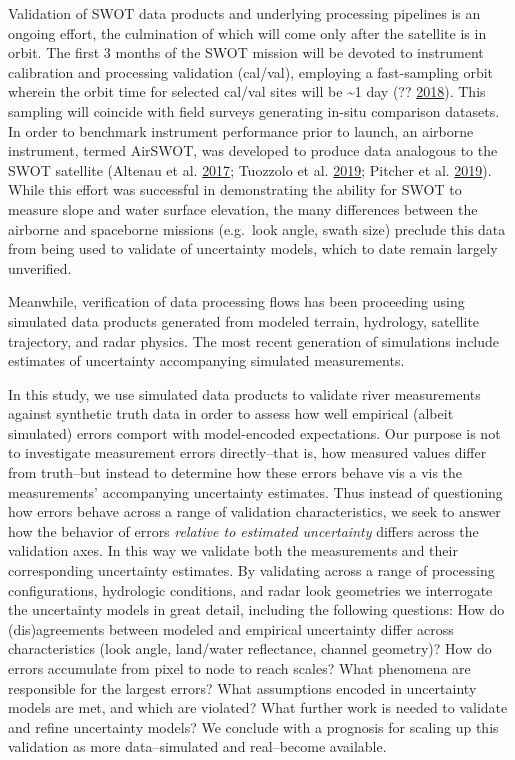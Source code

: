 \documentclass[]{book}
\begin{document}
Validation of SWOT data products and underlying processing pipelines is an ongoing effort, the culmination of which will come only after the satellite is in orbit. The first 3 months of the SWOT mission will be devoted to instrument calibration and processing validation (cal/val), employing a fast-sampling orbit wherein the orbit time for selected cal/val sites will be \textasciitilde1 day (?? \protect\hyperlink{ref-swot2018calval}{2018}). This sampling will coincide with field surveys generating in-situ comparison datasets. In order to benchmark instrument performance prior to launch, an airborne instrument, termed AirSWOT, was developed to produce data analogous to the SWOT satellite (Altenau et al. \protect\hyperlink{ref-altenau2017}{2017}; Tuozzolo et al. \protect\hyperlink{ref-tuozzolo2019}{2019}; Pitcher et al. \protect\hyperlink{ref-pitcher2019}{2019}). While this effort was successful in demonstrating the ability for SWOT to measure slope and water surface elevation, the many differences between the airborne and spaceborne missions (e.g.~look angle, swath size) preclude this data from being used to validate of uncertainty models, which to date remain largely unverified.

Meanwhile, verification of data processing flows has been proceeding using simulated data products generated from modeled terrain, hydrology, satellite trajectory, and radar physics. The most recent generation of simulations include estimates of uncertainty accompanying simulated measurements.

In this study, we use simulated data products to validate river measurements against synthetic truth data in order to assess how well empirical (albeit simulated) errors comport with model-encoded expectations. Our purpose is not to investigate measurement errors directly--that is, how measured values differ from truth--but instead to determine how these errors behave vis a vis the measurements' accompanying uncertainty estimates. Thus instead of questioning how errors behave across a range of validation characteristics, we seek to answer how the behavior of errors \emph{relative to estimated uncertainty} differs across the validation axes. In this way we validate both the measurements and their corresponding uncertainty estimates. By validating across a range of processing configurations, hydrologic conditions, and radar look geometries we interrogate the uncertainty models in great detail, including the following questions: How do (dis)agreements between modeled and empirical uncertainty differ across characteristics (look angle, land/water reflectance, channel geometry)? How do errors accumulate from pixel to node to reach scales? What phenomena are responsible for the largest errors? What assumptions encoded in uncertainty models are met, and which are violated? What further work is needed to validate and refine uncertainty models? We conclude with a prognosis for scaling up this validation as more data--simulated and real--become available.
\end{document}

